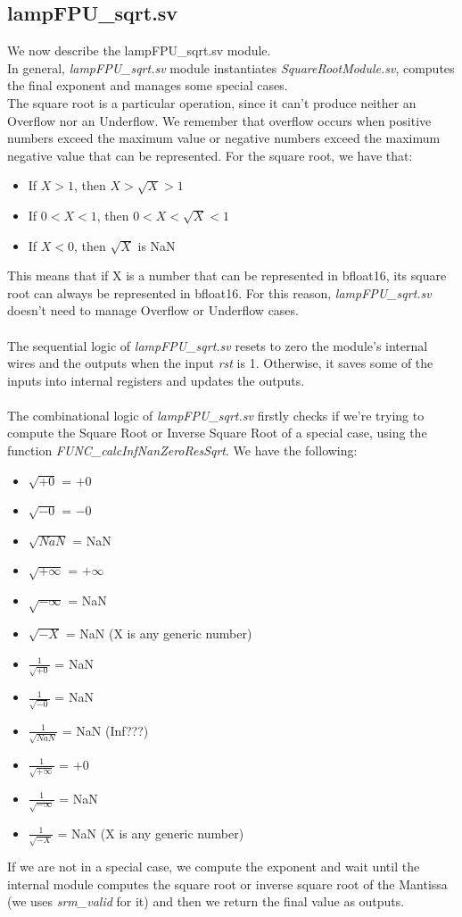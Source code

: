 \subsection{lampFPU\_sqrt.sv}
We now describe the lampFPU\_sqrt.sv module.\\
In general, \emph{lampFPU\_sqrt.sv} module instantiates \emph{SquareRootModule.sv}, computes the final exponent and manages some special cases. \\ 
The square root is a particular operation, since it can't produce neither an Overflow nor an Underflow. We remember that overflow occurs when positive numbers exceed the maximum value or negative numbers exceed the maximum negative value that can be represented. For the square root, we have that:
\begin{itemize}
\item If $X > 1$, then $X > \sqrt{X} > 1$ 
\item If $0 < X < 1$, then $0 < X < \sqrt{X} < 1$
\item If $X < 0$, then $\sqrt{X}$ is NaN
\end{itemize}
This means that if X is a number that can be represented in bfloat16, its square root can always be represented in bfloat16. For this reason, \emph{lampFPU\_sqrt.sv} doesn't need to manage Overflow or Underflow cases.\\ \\
The sequential logic of  \emph{lampFPU\_sqrt.sv} resets to zero the module's internal wires and the outputs when the input \emph{rst} is 1. Otherwise, it saves some of the inputs into internal registers and updates the outputs.\\\\
The combinational logic of \emph{lampFPU\_sqrt.sv} firstly checks if we're trying to compute the Square Root or Inverse Square Root of a special case, using the function \emph{FUNC\_calcInfNanZeroResSqrt}. We have the following:
\begin{itemize}
\item $\sqrt{+0}$ = $+0$ 
\item $\sqrt{-0}$ = $-0$
\item $\sqrt{NaN}$ = NaN
\item $\sqrt{+ \infty}$  =  $+\infty$
\item $\sqrt{- \infty}$ =  NaN
\item $\sqrt{- X}$ = NaN  (X is any generic number) 
\item $\frac{1}{\sqrt{+0}}$ = NaN
\item $\frac{1}{\sqrt{-0}}$ = NaN
\item $\frac{1}{\sqrt{NaN}}$ = NaN (Inf???)
\item $\frac{1}{\sqrt{+\infty}}$ = $+0$
\item $\frac{1}{\sqrt{-\infty}}$ = NaN
\item $\frac{1}{\sqrt{-X}}$ = NaN  (X is any generic number) 
\end{itemize}

If we are not in a special case, we compute the exponent and wait until the internal module computes the square root or inverse square root of the Mantissa (we uses  \emph{srm\_valid} for it) and then we return the final value as outputs. \\

\clearpage
